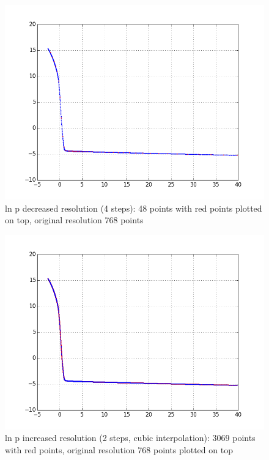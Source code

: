 \documentclass[10pt]{book}
\begin{document}
\begin{figure}[H]
 \centering
 \includegraphics[scale=0.5]{testData48.png}
 \caption{ln p decreased resolution (4 steps): 48 points with red points plotted on top, original resolution 768 points }
\end{figure}

\begin{figure}[H]
 \centering
 \includegraphics[scale=0.5]{testData3069.png}
 \caption{ln p increased resolution (2 steps, cubic interpolation): 3069 points with red points, original resolution 768 points plotted on top}
\end{figure}
\end{document}

